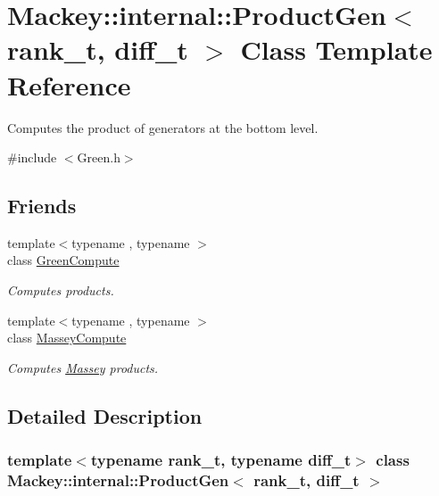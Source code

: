 \hypertarget{classMackey_1_1internal_1_1ProductGen}{}\section{Mackey\+:\+:internal\+:\+:Product\+Gen$<$ rank\+\_\+t, diff\+\_\+t $>$ Class Template Reference}
\label{classMackey_1_1internal_1_1ProductGen}


Computes the product of generators at the bottom level.  




{\ttfamily \#include $<$Green.\+h$>$}

\subsection*{Friends}
\begin{DoxyCompactItemize}
\item 
{\footnotesize template$<$typename , typename $>$ }\\class \hyperlink{classMackey_1_1internal_1_1ProductGen_a85de7c4aeeee34981e2020c2f9ddd3e2}{Green\+Compute}
\begin{DoxyCompactList}\small\item\em Computes products. \end{DoxyCompactList}\item 
{\footnotesize template$<$typename , typename $>$ }\\class \hyperlink{classMackey_1_1internal_1_1ProductGen_af259bfb9b4dced17104ac8fbb697355c}{Massey\+Compute}
\begin{DoxyCompactList}\small\item\em Computes \hyperlink{classMackey_1_1Massey}{Massey} products. \end{DoxyCompactList}\end{DoxyCompactItemize}


\subsection{Detailed Description}
\subsubsection*{template$<$typename rank\+\_\+t, typename diff\+\_\+t$>$\newline
class Mackey\+::internal\+::\+Product\+Gen$<$ rank\+\_\+t, diff\+\_\+t $>$}

